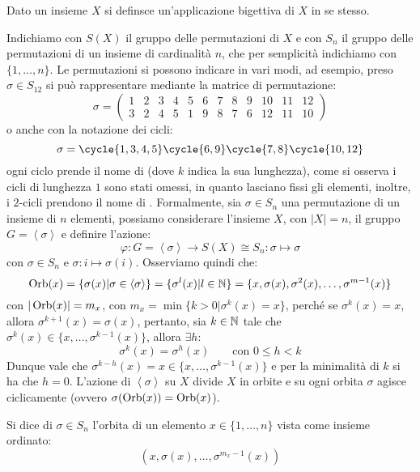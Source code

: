 \documentclass[11pt]{scrartcl}
\begin{document}
\begin{definition}
    Dato un insieme $X$ si definsce  un'applicazione bigettiva di $X$ in se stesso.
\end{definition}

Indichiamo con $S(X)$ il gruppo delle permutazioni di $X$ e con $S_n$ il gruppo delle permutazioni di un insieme di cardinalità $n$, che 
per semplicità indichiamo con $\{1,\ldots,n\}$.
Le permutazioni si possono indicare in vari modi, ad esempio, preso $\sigma \in S_{12}$ si può rappresentare mediante la matrice di permutazione:
    \[ \sigma = \left(\begin{array}{cccccccccccc}
        1 & 2 & 3 & 4 & 5 & 6 & 7 & 8 & 9 & 10 & 11 & 12 \\
        3 & 2 & 4 & 5 & 1 & 9 & 8 & 7 & 6 & 12 & 11 & 10 
        \end{array}\right)
        \]
o anche con la notazione dei cicli:
    \[ \sigma = \cycle{1,3,4,5} \cycle{6,9} \cycle{7,8} \cycle{10,12}
            \]
ogni ciclo prende il nome di  (dove $k$ indica la sua lunghezza), come si osserva i cicli di lunghezza $1$ sono stati omessi,
 in quanto lasciano fissi gli elementi, inoltre, i $2$-cicli prendono il nome di . Formalmente, sia $\sigma \in S_n$ una permutazione di un insieme di $n$ elementi,
 possiamo considerare l'insieme $X$, con $|X| = n$, il gruppo $G = \left<\sigma\right>$ e definire l'azione:
    \[ \varphi : G = \left<\sigma\right> \longrightarrow S(X) \cong S_n : \sigma \longmapsto \sigma
        \]
con $\sigma \in S_n$ e $\sigma : i \longmapsto \sigma(i)$. Osserviamo quindi che:
    \[ \operatorname{Orb}(x) = \{\sigma(x) | \sigma \in \left<\sigma\right>\} = \{\sigma^l(x) | l \in \mathbb N\} = \{x, \sigma(x), \sigma^2(x),\ldots,\sigma^{m-1}(x)\}
        \]
con $|\operatorname{Orb}(x)| = m_x$, con $m_x = \min\{k > 0 | \sigma^k(x) = x\}$, perché se $\sigma^k(x) = x$, allora $\sigma^{k+1}(x) = \sigma(x)$, pertanto, sia $k \in \mathbb N$
tale che $\sigma^k(x) \in \{x,\ldots,\sigma^{k-1}(x)\}$, allora $\exists h:$
    \[ \sigma^k(x) = \sigma^h(x)
    \qquad \text{con $0 \leq h < k$}
        \]
Dunque vale che $\sigma^{k-h}(x) = x \in \{x,\ldots,\sigma^{k-1}(x)\}$ e per la minimalità di $k$ si ha che $h = 0$.
L'azione di $\left<\sigma\right>$ su $X$ divide $X$ in orbite e su ogni orbita $\sigma$ agisce ciclicamente (ovvero $\sigma(\operatorname{Orb}(x)) = \operatorname{Orb}(x)$).

\begin{definition}
    Si dice  di $\sigma \in S_n$ l'orbita di un elemento $x \in \{1,\ldots,n\}$ vista come insieme ordinato:
        \[ (x,\sigma(x),\ldots,\sigma^{m_x-1}(x))
            \]
\end{definition}
\end{document}
